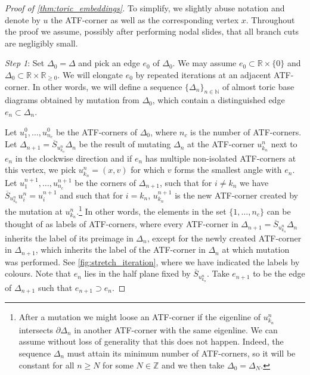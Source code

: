 \documentclass[AIF,Unicode,manuscript]{cedram}
\begin{document}
\begin{proof}[Proof of \cref{thm:toric_embeddings}]
To simplify, we slightly abuse notation and denote by $u$ the ATF-corner as well as the corresponding vertex $x$. Throughout the proof we assume, possibly after performing nodal slides, that all branch cuts are negligibly small.

\medskip

\emph{Step 1}:
Set $Δ_0 = Δ$ and pick an edge $e_0$ of $Δ_0$.
We may assume $e_0 ⊂ ℝ × \{0\}$ and $Δ_0 ⊂ ℝ × ℝ_{ ≥0}$.
We will elongate $e_0$ by repeated iterations at an adjacent ATF-corner.
In other words, we will define a sequence $\{\Delta_n\}_{n \in  \mathbb{N}}$ of almost toric base diagrams obtained by mutation from $\Delta_0$, which contain a distinguished edge $e_n \subset \Delta_n$.

Let $u_1^0,…,u_{n_c}^0$ be the ATF-corners of $Δ_0$, where $n_c$ is the number of ATF-corners.
Let $Δ_{n+1} = \overline{S}_{u_{k_n}^n} Δ_n$ be the result of mutating $Δ_n$ at the ATF-corner $u_{k_n}^n$ next to $e_n$ in the clockwise direction and if $e_n$ has multiple non-isolated ATF-corners at this vertex, we pick $u_{k_n}^n = (x,v)$ for which $v$ forms the smallest angle with $e_n$.
Let $u_1^{n+1},…,u_{n_c}^{n+1}$ be the corners of $Δ_{n+1}$, such that for $i ≠ k_n$ we have $\overline{S}_{u_{k_n}^n} u_i^n = u_i^{n+1}$ and such that for $i=k_n$, $u_{k_n}^{n+1}$ is the new ATF-corner created by the mutation at $u_{k_n}^n$.\footnote{After a mutation we might loose an ATF-corner if the eigenline of $u_{k_n}^n$ intersects $∂Δ_n$ in another ATF-corner with the same eigenline.
We can assume without loss of generality that this does not happen. Indeed, the sequence $Δ_n$ must attain its minimum number of ATF-corners, so it will be constant for all $n ≥N$ for some $N ∈ ℤ$ and we then take $Δ_0=Δ_N$.} In other words, the elements in the set $\{1,\ldots,n_c\}$ can be thought of as labels of ATF-corners, where every ATF-corner in $Δ_{n+1} = \overline{S}_{u_{k_n}^n} Δ_n$ inherits the label of its preimage in $\Delta_n$, except for the newly created ATF-corner in $\Delta_{n+1}$, which inherits the label of the ATF-corner in $\Delta_n$ at which mutation was performed.
See \cref{fig:stretch_iteration}, where we have indicated the labels by colours.
Note that $e_n$ lies in the half plane fixed by $\overline{S}_{u_{k_n}^n}$.
Take $e_{n+1}$ to be the edge of $Δ_{n+1}$ such that $e_{n+1} ⊃ e_n$.


\end{proof}
\end{document}
